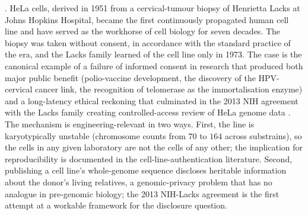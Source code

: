 . HeLa cells, derived in 1951 from
a cervical-tumour biopsy of Henrietta Lacks at Johns Hopkins
Hospital, became the first continuously propagated human cell line
and have served as the workhorse of cell biology for seven decades.
The biopsy was taken without consent, in accordance with the standard
practice of the era, and the Lacks family learned of the cell line
only in 1973. The case is the canonical example of a failure of
informed consent in research that produced both major public benefit
(polio-vaccine development, the discovery of the HPV-cervical cancer
link, the recognition of telomerase as the immortalisation enzyme)
and a long-latency ethical reckoning that culminated in the 2013
NIH agreement with the Lacks family creating controlled-access
review of HeLa genome data \cite{paper:v6c03-skloot-2010,
paper:v6c03-landry-2013, paper:v6c03-hudson-collins-2013,
acc:hela-lacks-1951}. The mechanism is engineering-relevant in two
ways. First, the line is karyotypically unstable (chromosome counts
from $70$ to $164$ across substrains), so the cells in any given
laboratory are not the cells of any other; the implication for
reproducibility is documented in the cell-line-authentication
literature. Second, publishing a cell line's whole-genome sequence
discloses heritable information about the donor's living relatives, a
genomic-privacy problem that has no analogue in pre-genomic biology;
the 2013 NIH-Lacks agreement is the first attempt at a workable
framework for the disclosure question.

